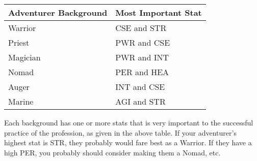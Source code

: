 \begin{normboxc}

\small
\begin{tabular}{@{}l l}
\textbf{Adventurer Background} & \textbf{Most Important Stat}\\
\midrule
Warrior & CSE and STR\\
Priest &  PWR and CSE\\
Magician &  PWR and INT\\
Nomad &  PER and HEA\\
Auger &  INT and CSE\\
Marine &  AGI and STR
\end{tabular}
\end{normboxc}

Each background has one or more stats that is very important to the successful practice of the profession, as given in the above table. If your adventurer's highest stat is
STR, they probably would fare best as a Warrior. If they have a high PER, you probably should consider making them a Nomad, etc.

